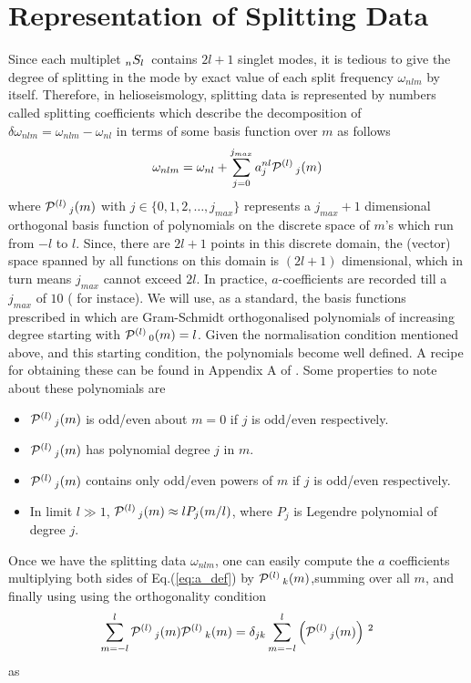 \section{Representation of Splitting Data}
Since each multiplet $_{n}S_{l}\,$ contains $2l+1$ singlet modes, it is tedious to give the degree of splitting in the mode by exact value of each split frequency $\omega_{nlm}$ by itself. Therefore, in helioseismology, splitting data is represented by numbers called splitting coefficients which describe the decomposition of $\delta\omega_{nlm} = \omega_{nlm}-\omega_{nl}$ in terms of some basis function over $m$ as follows
\begin{equation}
\omega_{nlm} = \omega_{nl} + \sum_{j=0}^{j_{max}} a^{nl}_j \mathcal{P}^{(l)}\,_j(m)
\label{eq:a_def}
\end{equation}
where $\mathcal{P}^{(l)}\,_{j}(m)$ with $j\in \{0,1,2,\ldots, j_{max}\}$ represents a $j_{max}+1$ dimensional orthogonal basis function of polynomials on the discrete space of $m$'s which run from $-l$ to $l$. Since, there are $2l+1$ points in this discrete domain, the (vector) space spanned by all functions on this domain is $(2l+1)$ dimensional, which in turn means $j_{max}$ cannot exceed $2l$. In practice, $a$-coefficients are recorded till a $j_{max}$ of $10$ (\cite{schou_data} for instace). We will use, as a standard, the basis functions prescribed in \cite{ritzwoller} which are Gram-Schmidt orthogonalised polynomials of increasing degree starting with $\mathcal{P}^{(l)}\,_0(m) = l$. Given the normalisation condition mentioned above, and this starting condition, the polynomials become well defined. A recipe for obtaining these can be found in Appendix A of \cite{schou_pol_94}. Some properties to note about these polynomials are
\begin{itemize}
\item $\mathcal{P}^{(l)}\,_j(m)$ is odd/even about $m=0$ if $j$ is odd/even respectively.
\item $\mathcal{P}^{(l)}\,_j(m)$ has polynomial degree $j$ in $m$.
\item $\mathcal{P}^{(l)}\,_j(m)$ contains only odd/even powers of $m$ if $j$ is odd/even respectively.
\item In limit $l \gg 1$, $\mathcal{P}^{(l)}\,_j(m) \approx lP_{j}(m/l)$, where $P_j$ is Legendre polynomial of degree $j$.
\end{itemize}

Once we have the splitting data $\omega_{nlm}$, one can easily compute the $a$ coefficients multiplying both sides of Eq.(\ref{eq:a_def}) by $\mathcal{P}^{(l)}\,_k(m)$,summing over all $m$, and finally using using the orthogonality condition $$\sum_{m=-l}^l \mathcal{P}^{(l)}\,_{j}(m) \mathcal{P}^{(l)}\,_{k}(m) = \delta_{jk} \sum_{m=-l}^l \left( \mathcal{P}^{(l)}\,_{j}(m) \right)\,^2$$
as

